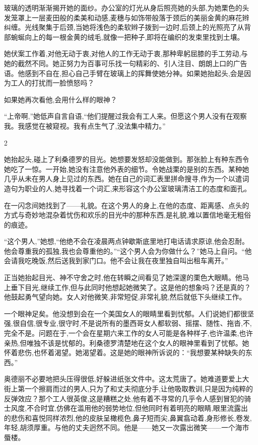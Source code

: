 \documentclass{ctexart}
\begin{document}
玻璃的透明渐渐揭开她的面纱。办公室的灯光从身后照亮她的头部,为她栗色的头发笼罩上一层麦田般的柔美和动感,麦穗与如饰带般落于颈后的美丽金黄的麻花辫纠缠。光线聚集于后颈,当她将浅色的柔软辫子拨到一边时,后颈上的光照亮了从背部蜿蜒向上的每一根金黄的绒毛,就像一把种子,即将在编织的发束里找到土壤。

她伏案工作着,对他无动于衷,对他人的工作无动于衷,那种卑躬屈膝的手工劳动,与她的截然不同。她正努力为百事可乐找一句精彩的、引人注目、朗朗上口的广告语。他感到不自在,担心自己手臂在玻璃上的挥舞使她分神。如果她抬起头,会是因为工人的打扰而一脸愤怒吗？

如果她再次看他,会用什么样的眼神？

``上帝啊,''她低声自言自语,``他们提醒过我会有工人来。但愿这个男人没有在观察我。我感觉在被窥视。我有点生气了,没法集中精力。''

\begin{center} 2 \end{center}

她抬起头,碰上了利桑德罗的目光。她想要发怒却没能做到。那张脸上有种东西令她吃了一惊。一开始,她没有注意他外表的细节。令她战栗的是别的东西。某种她几乎从未在男人身上见过的东西。她在自己的词汇表里拼命搜寻,作为一个以遣词造句为职业的人,她寻找着一个词汇,来形容这个办公室玻璃清洁工的态度和面孔。

在一闪念间她找到了——礼貌。在这个男人的身上,在他的态度、距离感、点头的方式与奇妙地混杂着忧伤和欢乐的目光中的那种东西,是礼貌,难以置信地毫无粗俗的痕迹。

“这个男人,”她想,“他绝不会在凌晨两点钟歇斯底里地打电话请求原谅,他会忍耐。他会尊重我的孤独,我也会尊重他的。”“这个男人会为你做什么？”她马上自问。“他会请我吃晚饭,然后送我到家门口。他不会让我在夜里独自叫出租车离开。”

正当她抬起目光、神不守舍之时,他在转瞬之间看见了她深邃的栗色大眼睛。他马上垂下目光,继续工作,但与此同时他想起她微笑了。这是他的想象吗？还是真的？他鼓起勇气望向她。女人对他微笑,非常短促,非常礼貌,然后就低下头继续工作。

一个眼神足矣。他没想到会在一个美国女人的眼睛里看到忧郁。人们说她们都很坚强,很自信,很专业,很守时,不是说所有的墨西哥女人都软弱、摇摆、随性、拖沓,不,完全不是。问题在于,一个会在星期六来工作的女人可能是各种样子,也许温柔,也许亲热,但唯独不该是忧郁的。利桑德罗清楚地在这个女人的眼神里看到了忧郁。她怀着悲伤,也怀着渴望。她渴望着。这是她的眼神所诉说的：“我想要某种缺失的东西。”

奥德丽不必要地把头压得很低,好躲进纸张文件中。这太荒唐了。她难道要爱上大街上第一个擦肩而过的男人,只为了和丈夫彻底分手,让他吸取教训,只是因为纯粹的反弹效应？那个工人很英俊,这是糟糕之处,他有着不寻常的几乎令人感到冒犯的骑士风度,不合时宜,仿佛在滥用他的弱势地位,但他同时有着明亮的眼睛,眼里流露出的悲伤和喜悦同样浓烈,他的皮肤呈橄榄色,鼻子短而尖,鼻翼翕动着,身形修长,卷发,年轻,胡须厚重。与他的丈夫迥然不同。他是——她又一次露出微笑——一个海市蜃楼。
\end{document}
